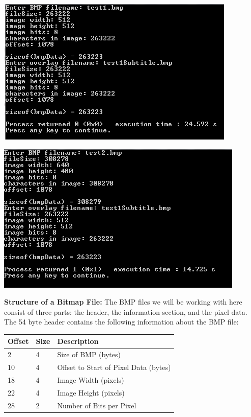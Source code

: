 \documentclass{article}
\newenvironment{Figure}
  {\par\medskip\noindent\ignorespaces\minipage{\linewidth}}
  {\endminipage\par\medskip}
\begin{document}
\begin{multicols*}{2}
\begin{Figure}
 \centering
 \includegraphics[width=\linewidth]{prompt.png}
\end{Figure}


\begin{Figure}
 \centering
 \includegraphics[width=\linewidth]{prompt2.png}
\end{Figure}

{\bf Structure of a Bitmap  File:}
The BMP files we will be working with here consist of three parts: the header, the information section, and the pixel data. The 54 byte header contains the following information about the BMP file:

\begin{center}
\begin{tabular}{| l | l | l | }
\hline
  Offset & Size & Description\\ \hline
  2 & 4  & Size of BMP (bytes) \\
  10 & 4 & Offset to Start of Pixel Data (bytes)\\
18 & 4 & Image Width (pixels)\\
22 & 4 & Image Height (pixels)\\
28 & 2 & Number of Bits per Pixel \\
\hline
\end{tabular}
\end{center}


\end{multicols*}
\end{document}
